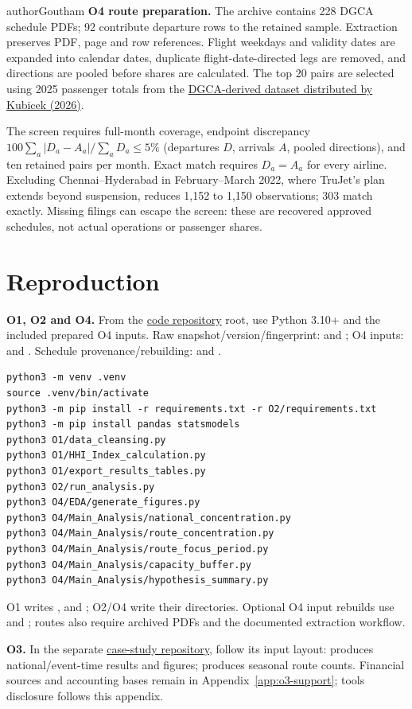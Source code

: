 \begin{mergedcontribution}{authorGoutham}
\textbf{O4 route preparation.} The archive contains 228 DGCA schedule PDFs; 92 contribute departure rows to the retained sample. Extraction preserves PDF, page and row references. Flight weekdays and validity dates are expanded into calendar dates, duplicate flight-date-directed legs are removed, and directions are pooled before shares are calculated. The top 20 pairs are selected using 2025 passenger totals from the \href{https://github.com/mkubicek/india-aviation-stats/tree/16770ac59dae61ce7b80fd8bd67dd7f4cef280a6}{DGCA-derived dataset distributed by Kubicek (2026)}.

The screen requires full-month coverage, endpoint discrepancy $100\sum_a|D_a-A_a|/\sum_aD_a\leq5\%$ (departures $D$, arrivals $A$, pooled directions), and ten retained pairs per month. Exact match requires $D_a=A_a$ for every airline. Excluding Chennai--Hyderabad in February--March 2022, where TruJet's plan extends beyond suspension, reduces 1,152 to 1,150 observations; 303 match exactly. Missing filings can escape the screen: these are recovered approved schedules, not actual operations or passenger shares.
\end{mergedcontribution}
\section{Reproduction}
\label{app:reproduction}
\textbf{O1, O2 and O4.} From the \href{https://github.com/Goutham7358/Assignment3_Code}{code repository} root, use Python 3.10+ and the included prepared O4 inputs. Raw snapshot/version/fingerprint:  and ; O4 inputs:  and . Schedule provenance/rebuilding:  and .
\begingroup
\footnotesize
\begin{verbatim}
python3 -m venv .venv
source .venv/bin/activate
python3 -m pip install -r requirements.txt -r O2/requirements.txt
python3 -m pip install pandas statsmodels
python3 O1/data_cleansing.py
python3 O1/HHI_Index_calculation.py
python3 O1/export_results_tables.py
python3 O2/run_analysis.py
python3 O4/EDA/generate_figures.py
python3 O4/Main_Analysis/national_concentration.py
python3 O4/Main_Analysis/route_concentration.py
python3 O4/Main_Analysis/route_focus_period.py
python3 O4/Main_Analysis/capacity_buffer.py
python3 O4/Main_Analysis/hypothesis_summary.py
\end{verbatim}
\endgroup
O1 writes ,  and ; O2/O4 write their  directories. Optional O4 input rebuilds use  and ; routes also require archived PDFs and the documented extraction workflow.

\textbf{O3.} In the separate \href{https://github.com/Goutham7358/Economics_New_Entrants_India_Domestic_Aviation}{case-study repository}, follow its input layout:  produces national/event-time results and figures;  produces seasonal route counts. Financial sources and accounting bases remain in Appendix~\ref{app:o3-support}; tools disclosure follows this appendix.
